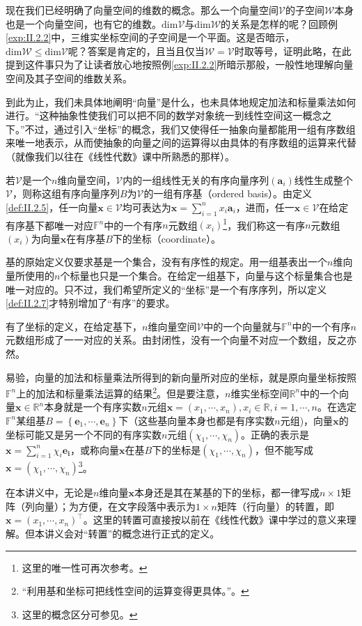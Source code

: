 \documentclass[main.tex]{subfiles}
\begin{document}
现在我们已经明确了向量空间的维数的概念。那么一个向量空间$\mathcal{V}$的子空间$\mathcal{W}$本身也是一个向量空间，也有它的维数。$\mathrm{dim}\mathcal{V}$与$\mathrm{dim}\mathcal{W}$的关系是怎样的呢？回顾例\ref{exp:II.2.2}中，三维实坐标空间的子空间是一个平面。这是否暗示，$\mathrm{dim}\mathcal{W}\leq\mathrm{dim}\mathcal{V}$呢？答案是肯定的，且当且仅当$\mathcal{W}=\mathcal{V}$时取等号，证明此略，在此提到这件事只为了让读者放心地按照例\ref{exp:II.2.2}所暗示那般，一般性地理解向量空间及其子空间的维数关系。

到此为止，我们未具体地阐明“向量”是什么，也未具体地规定加法和标量乘法如何进行。“这种抽象性使我们可以把不同的数学对象统一到线性空间这一概念之下。”\cite[p.~167]{周胜林2012线性代数}不过，通过引入“坐标”的概念，我们又使得任一抽象向量都能用一组有序数组来唯一地表示，从而使抽象的向量之间的运算得以由具体的有序数组的运算来代替（就像我们以往在《线性代数》课中所熟悉的那样）。

\begin{definition}[向量在给定有序基下的坐标]\label{def:II.2.7}若$\mathcal{V}$是一个$n$维向量空间，$\mathcal{V}$内的一组线性无关的有序向量序列$\left(\mathbf{a}_i\right)$线性生成整个$\mathcal{V}$，则称这组有序向量序列$B$为$\mathcal{V}$的一组有序基（ordered basis）。由定义\ref{def:II.2.5}，任一向量$\mathbf{x}\in\mathcal{V}$均可表达为$\mathbf{x}=\sum_{i=1}^nx_i\mathbf{a}_i$，进而，任一$\mathbf{x}\in\mathcal{V}$在给定有序基下都唯一对应$\mathbb{F}^n$中的一个有序$n$元数组$\left(x_i\right)$\footnote{这里的唯一性可再次参考\cite[“(3)的证明”，p.~171]{周胜林2012线性代数}。}，我们称这一有序$n$元数组$\left(x_i\right)$为向量$\mathbf{x}$在有序基$B$下的坐标（coordinate）。
\end{definition}

基的原始定义仅要求基是一个集合，没有有序性的规定。用一组基表出一个$n$维向量所使用的$n$个标量也只是一个集合。在给定一组基下，向量与这个标量集合也是唯一对应的。只不过，我们希望所定义的“坐标”是一个有序序列，所以定义\ref{def:II.2.7}才特别增加了“有序”的要求。

有了坐标的定义，在给定基下，$n$维向量空间$\mathcal{V}$中的一个向量就与$\mathbb{F}^n$中的一个有序$n$元数组形成了一一对应的关系。由封闭性，没有一个向量不对应一个数组，反之亦然。

易验，向量的加法和标量乘法所得到的新向量所对应的坐标，就是原向量坐标按照$\mathbb{F}^n$上的加法和标量乘法运算的结果\footnote{“利用基和坐标可把线性空间的运算变得更具体。”\cite[p.173]{周胜林2012线性代数}。}。但是要注意，$n$维实坐标空间$\mathbb{R}^n$中的一个向量$\mathbf{x}\in\mathbb{R}^n$本身就是一个有序实数$n$元组$\mathbf{x}=\left(x_1,\cdots,x_n\right),x_i\in\mathbb{R},i=1,\cdots,n$。在选定$\mathbb{F}^n$某组基$B=\left\{\mathbf{e}_1,\cdots,\mathbf{e}_n\right\}$下（这些基向量本身也都是有序实数$n$元组)，向量$\mathbf{x}$的坐标可能又是另一个不同的有序实数$n$元组$\left(\chi_1,\cdots,\chi_n\right)$。正确的表示是$\mathbf{x}=\sum_{i=1}^{n}\chi_i\mathbf{e_i}$，或称向量$\mathbf{x}$在基$B$下的坐标是$\left(\chi_1,\cdots,\chi_n\right)$，但不能写成$\mathbf{x}=\left(\chi_1,\cdots,\chi_n\right)$\footnote{这里的概念区分可参见\cite[例题2.1,p.~173]{周胜林2012线性代数}。}。

在本讲义中，无论是$n$维向量$\mathbf{x}$本身还是其在某基的下的坐标，都一律写成$n\times 1$矩阵（列向量）；为方便，在文字段落中表示为$1\times n$矩阵（行向量）的转置，即$\mathbf{x}=\left(x_1,\cdots,x_n\right)^\intercal$。这里的转置可直接按以前在《线性代数》课中学过的意义来理解。但本讲义会对“转置”的概念进行正式的定义。
\end{document}

